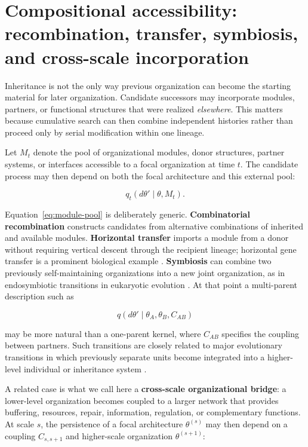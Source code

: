 \documentclass[11pt,a4paper]{article}
\begin{document}
\section{Compositional accessibility: recombination, transfer, symbiosis, and cross-scale incorporation}

Inheritance is not the only way previous organization can become the starting material for later organization. Candidate successors may incorporate modules, partners, or functional structures that were realized \emph{elsewhere}. This matters because cumulative search can then combine independent histories rather than proceed only by serial modification within one lineage.

Let $M_t$ denote the pool of organizational modules, donor structures, partner systems, or interfaces accessible to a focal organization at time $t$. The candidate process may then depend on both the focal architecture and this external pool:

\begin{equation}
q_t(d\theta'\mid\theta,M_t).
\label{eq:module-pool}
\end{equation}

Equation~\eqref{eq:module-pool} is deliberately generic. \textbf{Combinatorial recombination} constructs candidates from alternative combinations of inherited and available modules. \textbf{Horizontal transfer} imports a module from a donor without requiring vertical descent through the recipient lineage; horizontal gene transfer is a prominent biological example \citep{Soucy2015}. \textbf{Symbiosis} can combine two previously self-maintaining organizations into a new joint organization, as in endosymbiotic transitions in eukaryotic evolution \citep{Archibald2015}. At that point a multi-parent description such as

\[
q(d\theta'\mid\theta_A,\theta_B,C_{AB})
\]

may be more natural than a one-parent kernel, where $C_{AB}$ specifies the coupling between partners. Such transitions are closely related to major evolutionary transitions in which previously separate units become integrated into a higher-level individual or inheritance system \citep{SzathmarySmith1995}.

A related case is what we call here a \textbf{cross-scale organizational bridge}: a lower-level organization becomes coupled to a larger network that provides buffering, resources, repair, information, regulation, or complementary functions. At scale $s$, the persistence of a focal architecture $\theta^{(s)}$ may then depend on a coupling $C_{s,s+1}$ and higher-scale organization $\theta^{(s+1)}$:
\end{document}

